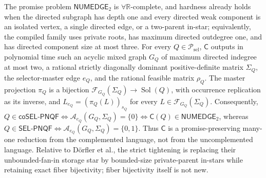 The promise problem \(\mathsf{NUMEDGE}_2\) is \(\forall\mathbb R\)-complete, and hardness already holds when the directed subgraph has depth one and every directed weak component is an isolated vertex, a single directed edge, or a two-parent in-star; equivalently, the compiled family uses private roots, has maximum directed outdegree one, and has directed component size at most three.  For every \(Q\in\mathcal P_{\mathrm{sel}}\), \(\mathsf C\) outputs in polynomial time such an acyclic mixed graph \(G_Q\) of maximum directed indegree at most two, a rational strictly diagonally dominant positive-definite matrix \(\Sigma_Q\), the selector-master edge \(e_Q\), and the rational feasible matrix \(\rho_Q\).  The master projection \(\pi_Q\) is a bijection \(\mathcal F_{G_Q}(\Sigma_Q)\to\operatorname{Sol}(Q)\), with occurrence replication as its inverse, and \(L_{e_Q}=(\pi_Q(L))_{s_Q}\) for every \(L\in\mathcal F_{G_Q}(\Sigma_Q)\).  Consequently, \(Q\in\mathsf{coSEL\mbox{-}PNQF}\Longleftrightarrow\mathcal A_{e_Q}(G_Q,\Sigma_Q)=\{0\}\Longleftrightarrow\mathsf C(Q)\in\mathsf{NUMEDGE}_2\), whereas \(Q\in\mathsf{SEL\mbox{-}PNQF}\Longleftrightarrow\mathcal A_{e_Q}(G_Q,\Sigma_Q)=\{0,1\}\).  Thus \(\mathsf C\) is a promise-preserving many-one reduction from the complemented language, not from the uncomplemented language.  Relative to Dörfler et al., the strict tightening is replacing their unbounded-fan-in storage star by bounded-size private-parent in-stars while retaining exact fiber bijectivity; fiber bijectivity itself is not new.
